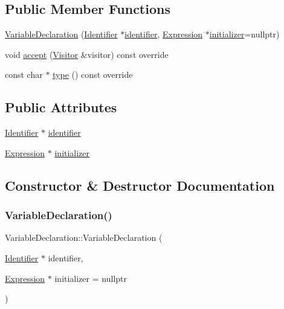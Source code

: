 \subsection*{Public Member Functions}
\begin{DoxyCompactItemize}
\item 
\hyperlink{struct_variable_declaration_ab1ee3bba021d48bca4da042a32873655}{Variable\+Declaration} (\hyperlink{struct_identifier}{Identifier} $\ast$\hyperlink{struct_variable_declaration_af00ca23e243d1ab865fd094c9be7a5c9}{identifier}, \hyperlink{struct_expression}{Expression} $\ast$\hyperlink{struct_variable_declaration_a472faa13a27b5cc06125787259116a2f}{initializer}=nullptr)
\item 
void \hyperlink{struct_variable_declaration_abdf0b5eed5200357de1bd9bf5ce6f6b3}{accept} (\hyperlink{struct_visitor}{Visitor} \&visitor) const override
\item 
const char $\ast$ \hyperlink{struct_variable_declaration_ad3a4af0a986f42e3655d1b2f174c9494}{type} () const override
\end{DoxyCompactItemize}
\subsection*{Public Attributes}
\begin{DoxyCompactItemize}
\item 
\hyperlink{struct_identifier}{Identifier} $\ast$ \hyperlink{struct_variable_declaration_af00ca23e243d1ab865fd094c9be7a5c9}{identifier}
\item 
\hyperlink{struct_expression}{Expression} $\ast$ \hyperlink{struct_variable_declaration_a472faa13a27b5cc06125787259116a2f}{initializer}
\end{DoxyCompactItemize}


\subsection{Constructor \& Destructor Documentation}
\mbox{\label{struct_variable_declaration_ab1ee3bba021d48bca4da042a32873655}} 
\subsubsection{\texorpdfstring{Variable\+Declaration()}{VariableDeclaration()}}
{\footnotesize\ttfamily Variable\+Declaration\+::\+Variable\+Declaration (\begin{DoxyParamCaption}\item[{\hyperlink{struct_identifier}{Identifier} $\ast$}]{identifier,  }\item[{\hyperlink{struct_expression}{Expression} $\ast$}]{initializer = {\ttfamily nullptr} }\end{DoxyParamCaption})\hspace{0.3cm}{\ttfamily [inline]}}



